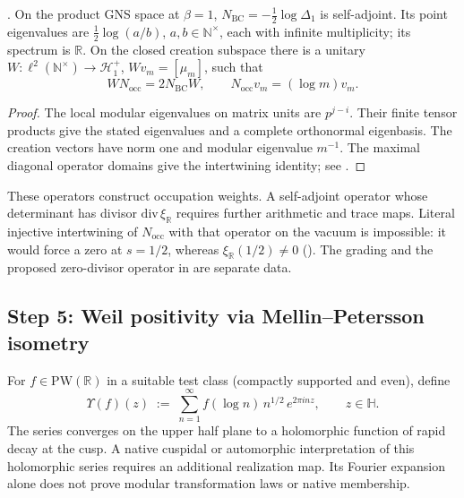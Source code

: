 \begin{theorem}
\label{v4-arith:w5-direct:thm:HPAr-elementary}
\ClaimStatusProvedHere.
On the product GNS space at \(\beta=1\),
\(N_{\mathrm{BC}}=-\tfrac12\log\Delta_1\) is self-adjoint. Its
point eigenvalues are \(\tfrac12\log(a/b)\), \(a,b\in\mathbb N^\times\),
each with infinite multiplicity; its spectrum is \(\mathbb R\).
On the closed creation subspace there is a unitary
\(W:\ell^2(\mathbb N^\times)\to\mathcal H_1^+\),
\(Wv_m=[\mu_m]\), such that
\[
        WN_{\mathrm{occ}}=2N_{\mathrm{BC}}W,
        \qquad N_{\mathrm{occ}}v_m=(\log m)v_m.
\]
\end{theorem}
\begin{proof}
The local modular eigenvalues on matrix units are \(p^{j-i}\).
Their finite tensor products give the stated eigenvalues and a complete
orthonormal eigenbasis. The creation vectors have norm one and modular
eigenvalue \(m^{-1}\). The maximal diagonal operator domains give the
intertwining identity; see .
\end{proof}

\begin{remark}
\label{v4-arith:w5-direct:rem:HPAr-stop}
These operators construct occupation weights. A self-adjoint operator
whose determinant has divisor \(\mathrm{div}\,\xi_{\mathbb R}\)
requires further arithmetic and trace maps. Literal injective
intertwining of \(N_{\mathrm{occ}}\) with that operator on the vacuum
is impossible: it would force a zero at \(s=1/2\), whereas
\(\xi_{\mathbb R}(1/2)\ne0\)
(). The grading and the proposed
zero-divisor operator in  are separate data.
\end{remark}

\subsection{Step 5: Weil positivity via Mellin--Petersson isometry}
\label{v4-arith:w5-direct:step-5}

\begin{definition}
\label{v4-arith:w5-direct:def:mellin-lift}
For \(f\in\mathrm{PW}(\mathbb{R})\) in a suitable test class (compactly
supported and even), define
\begin{equation}
\label{v4-arith:w5-direct:eq:mellin-lift}
\Upsilon(f)(z)\;:=\;\sum_{n=1}^{\infty}f(\log n)\,n^{1/2}\,e^{2\pi inz},
\qquad z\in\mathbb{H}.
\end{equation}
The series converges on the upper half plane to a holomorphic function
of rapid decay at the cusp. A native cuspidal or automorphic interpretation of this holomorphic
series requires an additional realization map. Its Fourier expansion
alone does not prove modular transformation laws or native membership.
\end{definition}

